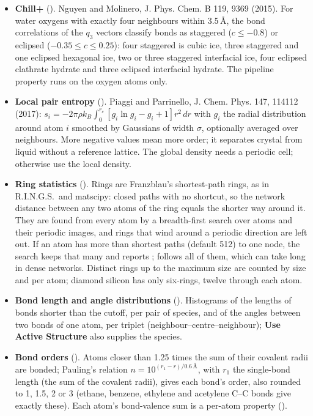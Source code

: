 \begin{itemize}
\item \textbf{Chill+} (). Nguyen and Molinero, J. Phys. Chem. B 119, 9369 (2015). For water oxygens with exactly four neighbours within 3.5\,\AA, the bond correlations of the $q_3$ vectors classify bonds as staggered ($c\le-0.8$) or eclipsed ($-0.35\le c\le0.25$): four staggered is cubic ice, three staggered and one eclipsed hexagonal ice, two or three staggered interfacial ice, four eclipsed clathrate hydrate and three eclipsed interfacial hydrate. The pipeline property runs on the oxygen atoms only.
\item \textbf{Local pair entropy} (). Piaggi and Parrinello, J. Chem. Phys. 147, 114112 (2017): $s_i=-2\pi\rho k_B\int_0^{r_c}[g_i\ln g_i-g_i+1]r^2\,dr$ with $g_i$ the radial distribution around atom $i$ smoothed by Gaussians of width $\sigma$, optionally averaged over neighbours. More negative values mean more order; it separates crystal from liquid without a reference lattice. The global density needs a periodic cell; otherwise use the local density.
\item \textbf{Ring statistics} (). Rings are Franzblau's shortest-path rings, as in R.I.N.G.S.\ and matscipy: closed paths with no shortcut, so the network distance between any two atoms of the ring equals the shorter way around it. They are found from every atom by a breadth-first search over atoms and their periodic images, and rings that wind around a periodic direction are left out. If an atom has more than  shortest paths (default 512) to one node, the search keeps that many and reports ;  follows all of them, which can take long in dense networks. Distinct rings up to the maximum size are counted by size and per atom; diamond silicon has only six-rings, twelve through each atom.
\item \textbf{Bond length and angle distributions} (). Histograms of the lengths of bonds shorter than the cutoff, per pair of species, and of the angles between two bonds of one atom, per triplet (neighbour--centre--neighbour); \textbf{Use Active Structure} also supplies the species.
\item \textbf{Bond orders} (). Atoms closer than 1.25 times the sum of their covalent radii are bonded; Pauling's relation $n=10^{(r_1-r)/0.6\,\text{\AA}}$, with $r_1$ the single-bond length (the sum of the covalent radii), gives each bond's order, also rounded to 1, 1.5, 2 or 3 (ethane, benzene, ethylene and acetylene C--C bonds give exactly these). Each atom's bond-valence sum is a per-atom property ().

\end{itemize}

